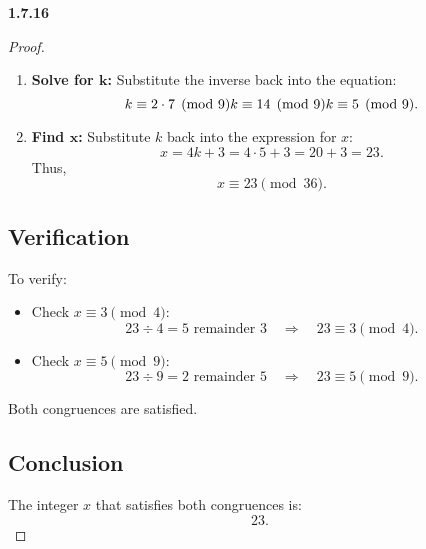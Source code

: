 \documentclass[12pt]{amsart}
\theoremstyle{definition}
\numberwithin{equation}{section}
\begin{document}
\begin{exercise}{\textbf{1.7.16}}
\begin{proof}
\begin{enumerate}[label=\arabic*.]
\item \textbf{Solve for \(\mathbf{k}\):} Substitute the inverse back into the equation:
\[
k \equiv 2 \cdot 7 \pmod{9} \\
k \equiv 14 \pmod{9} \\
k \equiv 5 \pmod{9}.
\]

\item \textbf{Find \(\mathbf{x}\):} Substitute \(k\) back into the expression for \(x\):
\[
x = 4k + 3 = 4 \cdot 5 + 3 = 20 + 3 = 23.
\]
Thus,
\[
x \equiv 23 \pmod{36}.
\]

\end{enumerate}
\subsection*{Verification}
To verify:
\begin{itemize}[label=--]
    \item Check \(x \equiv 3 \pmod{4}\):
    \[
    23 \div 4 = 5 \text{ remainder } 3 \quad \Rightarrow \quad 23 \equiv 3 \pmod{4}.
    \]
    \item Check \(x \equiv 5 \pmod{9}\):
    \[
    23 \div 9 = 2 \text{ remainder } 5 \quad \Rightarrow \quad 23 \equiv 5 \pmod{9}.
    \]
\end{itemize}
Both congruences are satisfied.

\subsection*{Conclusion}
The integer \(x\) that satisfies both congruences is:
\[
\boxed{23}.
\]

\end{proof}
\end{exercise}
    
\end{document}

